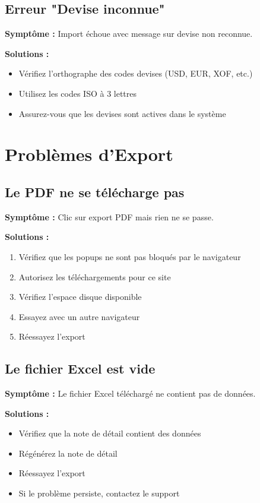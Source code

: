 \documentclass[12pt,a4paper]{report}
\begin{document}
\subsection{Erreur "Devise inconnue"}

\textbf{Symptôme :} Import échoue avec message sur devise non reconnue.

\textbf{Solutions :}

\begin{itemize}[leftmargin=*]
    \item Vérifiez l'orthographe des codes devises (USD, EUR, XOF, etc.)
    \item Utilisez les codes ISO à 3 lettres
    \item Assurez-vous que les devises sont actives dans le système
\end{itemize}

\section{Problèmes d'Export}

\subsection{Le PDF ne se télécharge pas}

\textbf{Symptôme :} Clic sur export PDF mais rien ne se passe.

\textbf{Solutions :}

\begin{enumerate}[leftmargin=*]
    \item Vérifiez que les popups ne sont pas bloqués par le navigateur
    \item Autorisez les téléchargements pour ce site
    \item Vérifiez l'espace disque disponible
    \item Essayez avec un autre navigateur
    \item Réessayez l'export
\end{enumerate}

\subsection{Le fichier Excel est vide}

\textbf{Symptôme :} Le fichier Excel téléchargé ne contient pas de données.

\textbf{Solutions :}

\begin{itemize}[leftmargin=*]
    \item Vérifiez que la note de détail contient des données
    \item Régénérez la note de détail
    \item Réessayez l'export
    \item Si le problème persiste, contactez le support
\end{itemize}
\end{document}
